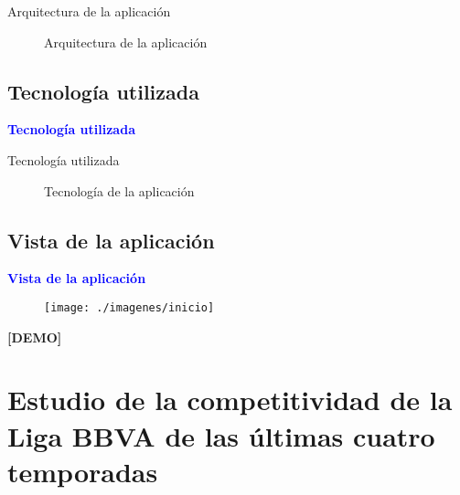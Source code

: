 \documentclass[10pt]{beamer}
\begin{document}
	\begin{frame}{Arquitectura de la aplicación}
		\begin{figure}
			\centering
			\resizebox{!}{0.7\textheight}{\arquitectura}
			\caption{Arquitectura de la aplicación}
			\label{fig:arquitectura}
		\end{figure}
	\end{frame}
	
	\subsection{Tecnología utilizada}
	
	\begin{frame}
		\begin{center}
			\Huge\textbf{\textsf{\textcolor{blue}{Tecnología utilizada}}}
		\end{center}
	\end{frame}
	
	\begin{frame}{Tecnología utilizada}
		\begin{figure}
			\centering
			\resizebox{!}{0.7\textheight}{\tecnologia}
			\caption{Tecnología de la aplicación}
			\label{fig:tecnologia}
		\end{figure}
	\end{frame}
	
	\subsection{Vista de la aplicación}
	
	\begin{frame}
		\begin{center}
			\Huge\textbf{\textsf{\textcolor{blue}{Vista de la aplicación}}}\\
			
			\begin{figure}
			\centering
			\texttt{[image: ./imagenes/inicio]}
			\end{figure}
	
			\Huge\textbf{\textsf{{[DEMO]}}}
		\end{center}
	\end{frame}
	

	\section{Estudio de la competitividad de la Liga BBVA de las últimas cuatro temporadas}
	
\end{document}
